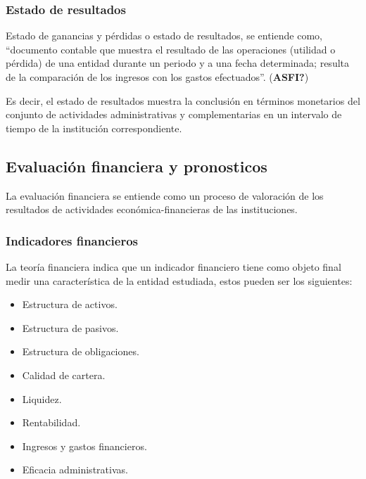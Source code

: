 \documentclass[
  12pt,
]{article}
\providecommand{\tightlist}{%
  \setlength{\itemsep}{0pt}\setlength{\parskip}{0pt}}
\begin{document}
\hypertarget{estado-de-resultados}{%
\subsubsection{Estado de resultados}\label{estado-de-resultados}}

Estado de ganancias y pérdidas o estado de resultados, se entiende como,
``documento contable que muestra el resultado de las operaciones
(utilidad o pérdida) de una entidad durante un periodo y a una fecha
determinada; resulta de la comparación de los ingresos con los gastos
efectuados''. (\textbf{ASFI?})

Es decir, el estado de resultados muestra la conclusión en términos
monetarios del conjunto de actividades administrativas y complementarias
en un intervalo de tiempo de la institución correspondiente.

\hypertarget{evaluaciuxf3n-financiera-y-pronosticos}{%
\subsection{Evaluación financiera y
pronosticos}\label{evaluaciuxf3n-financiera-y-pronosticos}}

La evaluación financiera se entiende como un proceso de valoración de
los resultados de actividades económica-financieras de las
instituciones.

\hypertarget{indicadores-financieros}{%
\subsubsection{Indicadores financieros}\label{indicadores-financieros}}

La teoría financiera indica que un indicador financiero tiene como
objeto final medir una característica de la entidad estudiada, estos
pueden ser los siguientes:

\begin{itemize}
\tightlist
\item
  Estructura de activos.
\item
  Estructura de pasivos.
\item
  Estructura de obligaciones.
\item
  Calidad de cartera.
\item
  Liquidez.
\item
  Rentabilidad.
\item
  Ingresos y gastos financieros.
\item
  Eficacia administrativas.
\end{itemize}
\end{document}
